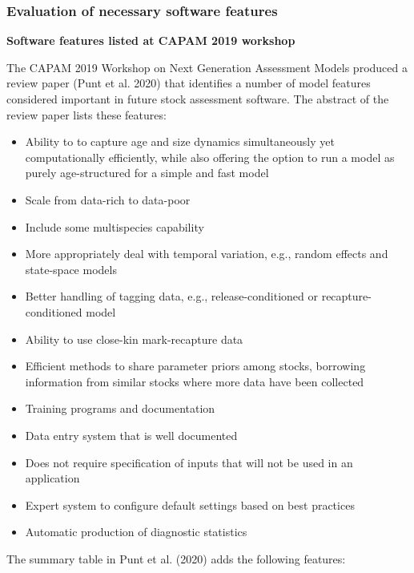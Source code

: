 \documentclass{SCreport}
\begin{document}
\subsubsection{Evaluation of necessary software features}

\vspace{1ex}

\textbf{Software features listed at CAPAM 2019 workshop}

\vspace{1ex}

The CAPAM 2019 Workshop on Next Generation Assessment Models produced a review
paper (Punt et al. 2020) that identifies a number of model features considered
important in future stock assessment software. The abstract of the review paper
lists these features:

\begin{itemize}
  \item Ability to to capture age and size dynamics simultaneously yet
  computationally efficiently, while also offering the option to run a model as
  purely age-structured for a simple and fast model
  \item Scale from data-rich to data-poor
  \item Include some multispecies capability
  \item More appropriately deal with temporal variation, e.g., random effects
  and state-space models
  \item Better handling of tagging data, e.g., release-conditioned or
  recapture-conditioned model
  \item Ability to use close-kin mark-recapture data
  \item Efficient methods to share parameter priors among stocks, borrowing
  information from similar stocks where more data have been collected
  \item Training programs and documentation
  \item Data entry system that is well documented
  \item Does not require specification of inputs that will not be used in an
  application
  \item Expert system to configure default settings based on best practices
  \item Automatic production of diagnostic statistics
\end{itemize}

\newpage

The summary table in Punt et al. (2020) adds the following features:
\end{document}
